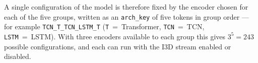 \documentclass[../main.tex]{subfiles}
\begin{document}
A single configuration of the model is therefore fixed by the encoder chosen for each of the five groups, written as an \texttt{arch\_key} of five tokens in group order --- for example \texttt{TCN\_T\_TCN\_LSTM\_T} (\texttt{T}~=~Transformer, \texttt{TCN}~=~TCN, \texttt{LSTM}~=~LSTM). With three encoders available to each group this gives $3^{5}=243$ possible configurations, and each can run with the I3D stream enabled or disabled.
\end{document}
